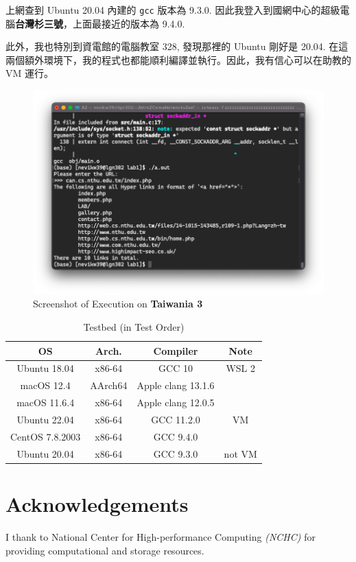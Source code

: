 \documentclass[12pt, a4paper]{article}
\begin{document}
上網查到 \textsf{Ubuntu} 20.04 內建的 \texttt{gcc} 版本為 9.3.0. 因此我登入到國網中心的超級電腦\textbf{台灣杉三號}，上面最接近的版本為 9.4.0.

此外，我也特別到資電館的電腦教室 328, 發現那裡的 \textsf{Ubuntu} 剛好是 20.04. 在這兩個額外環境下，我的程式也都能順利編譯並執行。因此，我有信心可以在助教的 VM 運行。

\begin{figure}[H]
\centering
\includegraphics[width=\linewidth]{screenshot_twnia3}
\caption{Screenshot of Execution on \textbf{Taiwania 3}}
\label{fig:screenshot_twnia3}
\end{figure}


\begin{table}[htp]
\caption{Testbed (in Test Order)}
\centering
\begin{tabular}{c|c|c|c}
OS & Arch. & Compiler & Note \\\hline
Ubuntu 18.04 & x86-64 & GCC 10 & WSL 2 \\
macOS 12.4 & AArch64 & Apple clang 13.1.6 \\
macOS 11.6.4 & x86-64 & Apple clang 12.0.5 \\
Ubuntu 22.04 & x86-64 & GCC 11.2.0 & VM \\
CentOS 7.8.2003 & x86-64 & GCC 9.4.0 \\
Ubuntu 20.04 & x86-64 & GCC 9.3.0 & not VM \\
\end{tabular}
\label{tab:testbed}
\end{table}

\section*{Acknowledgements}

I thank to \textsf{National Center for High-performance Computing} \textit{(NCHC)} for providing computational and storage resources.
\end{document}
